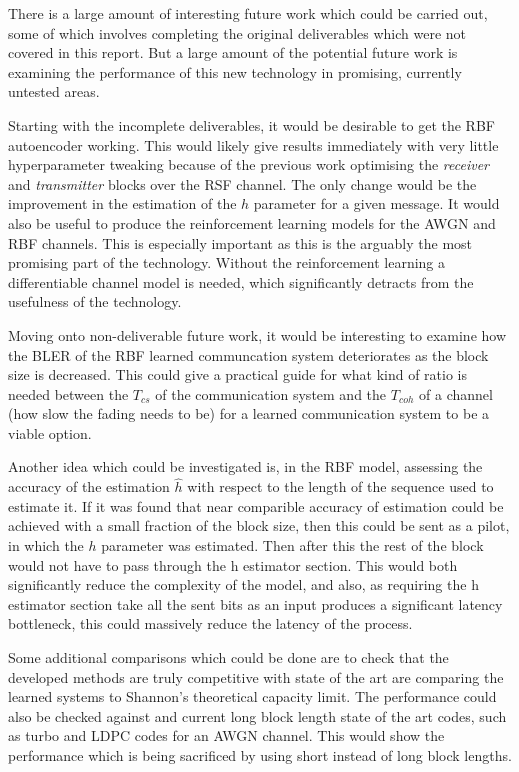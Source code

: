 \documentclass[12pt,onecolumn,letterpaper]{article}
\newcommand{\code}{\textit}
\begin{document}
There is a large amount of interesting future work which could be carried out, some of which involves completing the original deliverables which were not covered in this report. But a large amount of the potential future work is examining the performance of this new technology in promising, currently untested areas.

Starting with the incomplete deliverables, it would be desirable to get the RBF autoencoder working. This would likely give results immediately with very little hyperparameter tweaking because of the previous work optimising the \code{receiver} and \code{transmitter} blocks over the RSF channel. The only change would be the improvement in the estimation of the $h$ parameter for a given message. It would also be useful to produce the reinforcement learning models for the AWGN and RBF channels. This is especially important as this is the arguably the most promising part of the technology. Without the reinforcement learning a differentiable channel model is needed, which significantly detracts from the usefulness of the technology. 

Moving onto non-deliverable future work, it would be interesting to examine how the BLER of the RBF learned communcation system deteriorates as the block size is decreased. This could give a practical guide for what kind of ratio is needed between the $T_{cs}$ of the communication system and the $T_{coh}$ of a channel (how slow the fading needs to be) for a learned communication system to be a viable option.

Another idea which could be investigated is, in the RBF model, assessing the accuracy of the estimation $\hat{h}$ with respect to the length of the sequence used to estimate it. If it was found that near comparible accuracy of estimation could be achieved with a small fraction of the block size, then this could be sent as a pilot, in which the $h$ parameter was estimated. Then after this the rest of the block would not have to pass through the h estimator section. This would both significantly reduce the complexity of the model, and also, as requiring the h estimator section take all the sent bits as an input produces a significant latency bottleneck, this could massively reduce the latency of the process.

Some additional comparisons which could be done are to check that the developed methods are truly competitive with state of the art are comparing the learned systems to Shannon's theoretical capacity limit. The performance could also be checked against and current long block length state of the art codes, such as turbo and LDPC codes for an AWGN channel. This would show the performance which is being sacrificed by using short instead of long block lengths.
\end{document}
